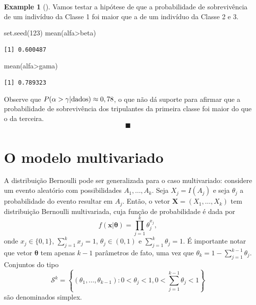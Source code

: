 \documentclass[
  letterpaper,
  DIV=11,
  numbers=noendperiod]{scrreprt}
\newenvironment{Shaded}{\begin{snugshade}}{\end{snugshade}}
\newcommand{\DecValTok}[1]{\textcolor[rgb]{0.68,0.00,0.00}{#1}}
\newcommand{\FunctionTok}[1]{\textcolor[rgb]{0.28,0.35,0.67}{#1}}
\newcommand{\NormalTok}[1]{\textcolor[rgb]{0.00,0.23,0.31}{#1}}
\newcommand{\SpecialCharTok}[1]{\textcolor[rgb]{0.37,0.37,0.37}{#1}}
\theoremstyle{definition}
\theoremstyle{plain}
\theoremstyle{definition}
\newtheorem{example}{Example}[chapter]
\theoremstyle{remark}
\begin{document}
\begin{example}[]
Vamos testar a hipótese de que a probabilidade de sobrevivência de um
indivíduo da Classe 1 foi maior que a de um indivíduo da Classe 2 e 3.

\begin{Shaded}
\begin{Highlighting}[]
\FunctionTok{set.seed}\NormalTok{(}\DecValTok{123}\NormalTok{)}
\FunctionTok{mean}\NormalTok{(alfa}\SpecialCharTok{\textgreater{}}\NormalTok{beta)}
\end{Highlighting}
\end{Shaded}

\begin{verbatim}
[1] 0.600487
\end{verbatim}

\begin{Shaded}
\begin{Highlighting}[]
\FunctionTok{mean}\NormalTok{(alfa}\SpecialCharTok{\textgreater{}}\NormalTok{gama)}
\end{Highlighting}
\end{Shaded}

\begin{verbatim}
[1] 0.789323
\end{verbatim}

Observe que \(P(\alpha>\gamma|\hbox{dados})\approx 0,78\), o que não dá
suporte para afirmar que a probabilidade de sobrevivência dos
tripulantes da primeira classe foi maior do que o da terceira.
\[\blacksquare\]

\end{example}

\section{O modelo multivariado}\label{o-modelo-multivariado}

A distribuição Bernoulli pode ser generalizada para o caso multivariado:
considere um evento aleatório com possibilidades \(A_1,\ldots,A_k\).
Seja \(X_j=I(A_j)\) e seja \(\theta_j\) a probabilidade do evento
resultar em \(A_j\). Então, o vetor \(\boldsymbol{X}=(X_1,\ldots,X_k)\)
tem distribuição Bernoulli multivariada, cuja função de probabilidade é
dada por
\[f(\boldsymbol{x}|\boldsymbol{\theta})=\prod_{j=1}^k\theta_j^{x_{j}},\]
onde \(x_j\in\{0,1\}\), \(\sum_{j=1}^kx_j=1\), \(\theta_j\in(0,1)\) e
\(\sum_{j=1}^k\theta_j=1\). É importante notar que vetor
\(\boldsymbol{\theta}\) tem apenas \(k-1\) parâmetros de fato, uma vez
que \(\theta_k=1-\sum_{j=1}^{k-1}\theta_j\). Conjuntos do tipo
\[\mathcal{S}^k=\left\{(\theta_1,\ldots,\theta_{k-1}):0<\theta_j<1,0<\sum_{j=1}^{k-1}\theta_j<1\right\}\]
são denominados simplex.
\end{document}
